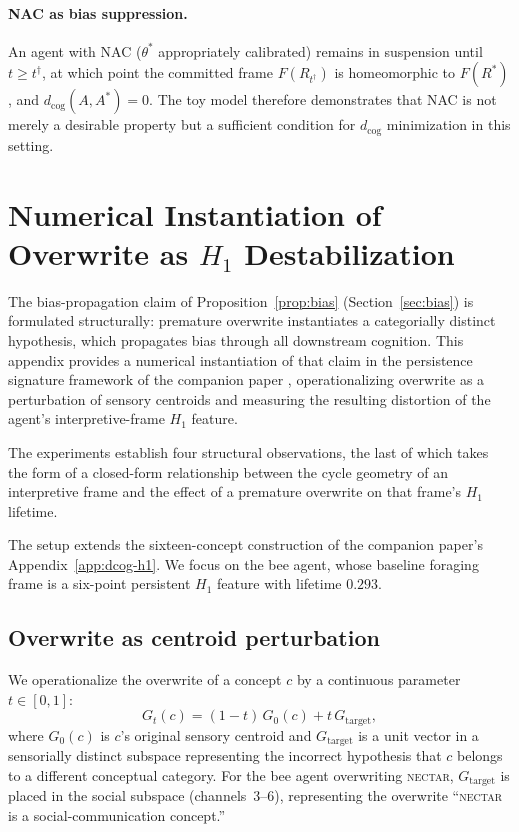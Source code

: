 \documentclass[12pt]{article}
\begin{document}
\paragraph{NAC as bias suppression.}
An agent with NAC ($\theta^*$ appropriately calibrated) remains in
suspension until $t \geq t^\dagger$, at which point the committed
frame $F(R_{t^\dagger})$ is homeomorphic to $F(R^*)$, and
$d_\mathrm{cog}(A, A^*) = 0$.
The toy model therefore demonstrates that NAC is not merely a
desirable property but a sufficient condition for $d_\mathrm{cog}$
minimization in this setting.

\section{Numerical Instantiation of Overwrite as $H_1$
Destabilization}
\label{app:overwrite-h1}

The bias-propagation claim of Proposition~\ref{prop:bias}
(Section~\ref{sec:bias}) is formulated structurally: premature
overwrite instantiates a categorially distinct hypothesis, which
propagates bias through all downstream cognition. This appendix
provides a numerical instantiation of that claim in the persistence
signature framework of the companion paper
\cite{minamoto2026topology}, operationalizing overwrite as a
perturbation of sensory centroids and measuring the resulting
distortion of the agent's interpretive-frame $H_1$ feature.

The experiments establish four structural observations, the last
of which takes the form of a closed-form relationship between the
cycle geometry of an interpretive frame and the effect of a
premature overwrite on that frame's $H_1$ lifetime.

The setup extends the sixteen-concept construction of the companion
paper's Appendix~\ref{app:dcog-h1}. We focus on the bee agent,
whose baseline foraging frame is a six-point persistent $H_1$
feature with lifetime $0.293$.

\subsection*{Overwrite as centroid perturbation}

We operationalize the overwrite of a concept $c$ by a continuous
parameter $t \in [0, 1]$:
\[
G_t(c) = (1 - t)\, G_0(c) + t\, G_\mathrm{target},
\]
where $G_0(c)$ is $c$'s original sensory centroid and
$G_\mathrm{target}$ is a unit vector in a sensorially distinct
subspace representing the incorrect hypothesis that $c$ belongs to
a different conceptual category. For the bee agent overwriting
\textsc{nectar}, $G_\mathrm{target}$ is placed in the social
subspace (channels~3--6), representing the overwrite
``\textsc{nectar} is a social-communication concept.''
\end{document}
